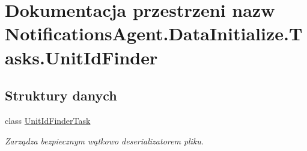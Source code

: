 \hypertarget{a00302}{}\section{Dokumentacja przestrzeni nazw Notifications\+Agent.\+Data\+Initialize.\+Tasks.\+Unit\+Id\+Finder}
\label{a00302}
\subsection*{Struktury danych}
\begin{DoxyCompactItemize}
\item 
class \hyperlink{a00078}{Unit\+Id\+Finder\+Task}
\begin{DoxyCompactList}\small\item\em Zarządza bezpiecznym wątkowo deserializatorem pliku. \end{DoxyCompactList}\end{DoxyCompactItemize}
